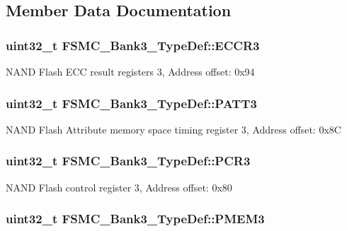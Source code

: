 \subsection{Member Data Documentation}
\hypertarget{struct_f_s_m_c___bank3___type_def_a6935beb5bbc2de668024c1989eecd46c}{
\subsubsection[{E\-C\-C\-R3}]{ uint32\-\_\-t F\-S\-M\-C\-\_\-\-Bank3\-\_\-\-Type\-Def\-::\-E\-C\-C\-R3}}\label{struct_f_s_m_c___bank3___type_def_a6935beb5bbc2de668024c1989eecd46c}
N\-A\-N\-D Flash E\-C\-C result registers 3, Address offset\-: 0x94 \hypertarget{struct_f_s_m_c___bank3___type_def_a0cbf1b4647f98914238202828de47416}{
\subsubsection[{P\-A\-T\-T3}]{ uint32\-\_\-t F\-S\-M\-C\-\_\-\-Bank3\-\_\-\-Type\-Def\-::\-P\-A\-T\-T3}}\label{struct_f_s_m_c___bank3___type_def_a0cbf1b4647f98914238202828de47416}
N\-A\-N\-D Flash Attribute memory space timing register 3, Address offset\-: 0x8\-C \hypertarget{struct_f_s_m_c___bank3___type_def_a1f772e1028641cab7b923bf02115b919}{
\subsubsection[{P\-C\-R3}]{ uint32\-\_\-t F\-S\-M\-C\-\_\-\-Bank3\-\_\-\-Type\-Def\-::\-P\-C\-R3}}\label{struct_f_s_m_c___bank3___type_def_a1f772e1028641cab7b923bf02115b919}
N\-A\-N\-D Flash control register 3, Address offset\-: 0x80 \hypertarget{struct_f_s_m_c___bank3___type_def_a756258d9266b1eee3455bc850107beb6}{
\subsubsection[{P\-M\-E\-M3}]{ uint32\-\_\-t F\-S\-M\-C\-\_\-\-Bank3\-\_\-\-Type\-Def\-::\-P\-M\-E\-M3}}\label{struct_f_s_m_c___bank3___type_def_a756258d9266b1eee3455bc850107beb6}
